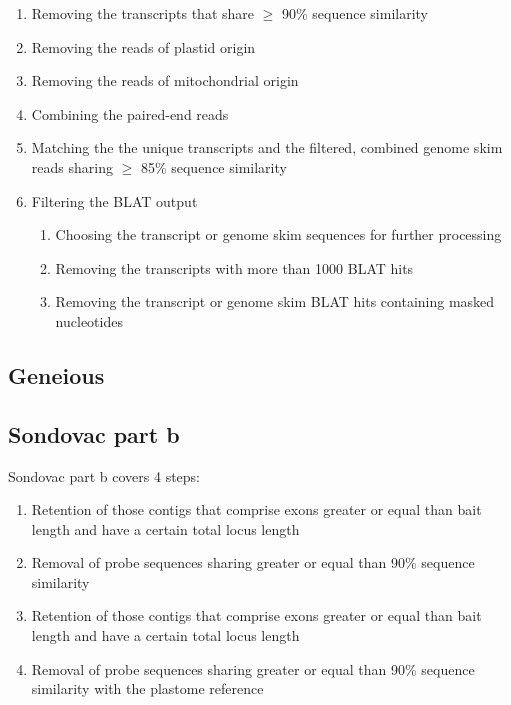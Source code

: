 \begin{enumerate}
\item Removing the transcripts that share $\geq$ 90\% sequence similarity

\item Removing the reads of plastid origin

\item Removing the reads of mitochondrial origin

\item Combining the paired-end reads

\item Matching the the unique transcripts and the filtered, combined genome skim reads sharing $\geq$ 85\% sequence similarity

\item Filtering the BLAT output
\begin{enumerate}
\item Choosing the transcript or genome skim sequences for further processing
\item Removing the transcripts with more than 1000 BLAT hits
\item Removing the transcript or genome skim BLAT hits containing masked nucleotides
\end{enumerate}
\end{enumerate}


\subsection{Geneious}

\subsection{Sondovac part b}
Sondovac part b covers 4 steps:
  
\begin{enumerate}
\item Retention of those contigs that comprise exons greater or equal than bait length and have a certain total locus length
\item Removal of probe sequences sharing greater or equal than 90\% sequence similarity
\item Retention of those contigs that comprise exons greater or equal than bait length and have a certain total locus length
\item Removal of probe sequences sharing greater or equal than 90\% sequence similarity with the plastome reference
\end{enumerate}

